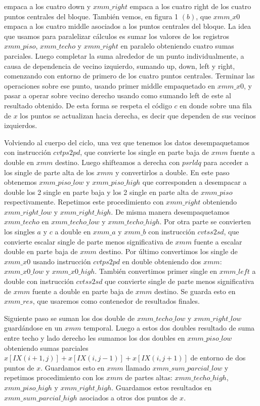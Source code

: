 empaca a los cuatro down y $xmm\_right$ empaca a los cuatro right de los cuatro puntos centrales del bloque. También vemos, en figura 1 $(b)$, que $xmm\_x0$ empaca a los cuatro middle asociados a los puntos centrales del bloque.
La idea que usamos para paralelizar cálculos es sumar los valores de los registros $xmm\_piso$,
$xmm\_techo$ y $xmm\_right$ en paralelo obteniendo cuatro sumas parciales.
Luego completar la suma alrededor de un punto individualmente, a causa de dependencia de vecino izquierdo, sumando up, down, left y right, comenzando con entorno de primero de los cuatro puntos centrales. Terminar las operaciones sobre ese punto, usando primer middle empaquetado en $xmm\_x0$, y pasar a operar sobre vecino derecho usando como sumando left de este al resultado obtenido.
De esta forma se respeta el código $c$ en donde sobre una fila de $x$ los 
puntos se actualizan hacia derecha, es decir que dependen de sus vecinos izquierdos.\newline
  
\par Volviendo al cuerpo del ciclo, una vez que tenemos los datos desempaquetamos con instrucción $cvtps2pd$, que convierte los single en parte baja de $xmm$ fuente a double en $xmm$ destino. Luego shifteamos a derecha con $psrldq$ para acceder a los single de parte alta de los $xmm$ y convertirlos a double. En este paso obtenemos $xmm\_piso\_low$ y $xmm\_piso\_high$ que corresponden a desempacar a double los 2 single en parte baja y los 2 single en parte alta de $xmm\_piso$ respectivamente.
Repetimos este procedimiento con $xmm\_right$ obteniendo $xmm\_right\_low$ y $xmm\_right\_high$. De misma manera desempaquetamos $xmm\_techo$ en $xmm\_techo\_low$ y $xmm\_techo\_high$.
Por otra parte se convierten los singles $a$ y $c$ a double en $xmm\_a$ y $xmm\_b$ con instrucción
$cvtss2sd$, que convierte escalar single de parte menos significativa de $xmm$ fuente a
escalar double en parte baja de $xmm$ destino. 
Por último convertimos los single de $xmm\_x0$ usando instrucción $cvtps2pd$ en double obteniendo dos
$xmm$: $xmm\_x0\_low$ y $xmm\_x0\_high$. También convertimos primer single en $xmm\_left$ a double con instrucción $cvtss2sd$ que convierte single de parte menos significativa de $xmm$ fuente a double en parte baja de $xmm$ destino. Se guarda esto en $xmm\_res$, que usaremos como contenedor de resultados finales.\newline

\par Siguiente paso se suman los dos double de $xmm\_techo\_low$ y $xmm\_right\_low$ guardándose en un $ xmm$ temporal. 
Luego a estos dos doubles resultado de suma entre techo y lado derecho les sumamos los dos doubles
en $xmm\_piso\_low$ obteniendo sumas parciales $x[IX(i+1,j)]+x[IX(i,j-1)]+x[IX(i,j+1)]$ de entorno de dos puntos de $x$.
Guardamos esto en $xmm$ llamado $xmm\_sum\_parcial\_low$ y repetimos procedimiento con los $xmm$
de partes altas: $xmm\_techo\_high$, $xmm\_piso\_high$ y $xmm\_right\_high$. Guardamos
estos resultados en $xmm\_sum\_parcial\_high$ asociados a otros dos puntos de $x$.\newline

